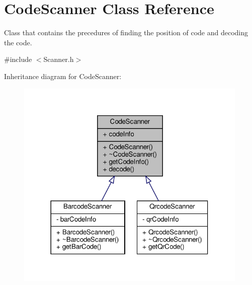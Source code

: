 \hypertarget{class_code_scanner}{}\section{Code\+Scanner Class Reference}
\label{class_code_scanner}


Class that contains the precedures of finding the position of code and decoding the code.  




{\ttfamily \#include $<$Scanner.\+h$>$}



Inheritance diagram for Code\+Scanner\+:
\nopagebreak
\begin{figure}[H]
\begin{center}
\leavevmode
\includegraphics[width=314pt]{class_code_scanner__inherit__graph}
\end{center}
\end{figure}


